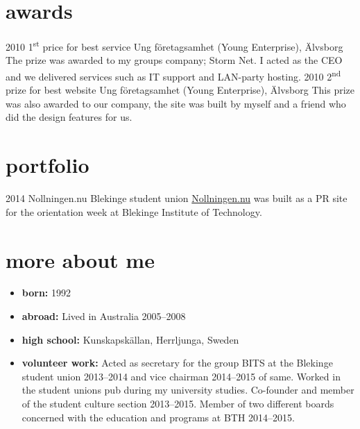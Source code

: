 \documentclass[]{friggeri-cv} %
\begin{document}

\section{awards}

\begin{entrylist}
\entry
{2010}
{1\textsuperscript{st} price for best service}
{Ung företagsamhet (Young Enterprise), Älvsborg}
{The prize was awarded to my groups company; Storm Net. I acted as the CEO and we delivered services such as IT support and LAN-party hosting.}
\entry
{2010}
{2\textsuperscript{nd} prize for best website}
{Ung företagsamhet (Young Enterprise), Älvsborg}
{This prize was also awarded to our company, the site was built by myself and a friend who did the design features for us.}
\end{entrylist}

\newpage
\section{portfolio}

\begin{entrylist}
\entry
{2014}
{Nollningen.nu}
{Blekinge student union}
{\href{http://www.nollningen.nu}{Nollningen.nu} was built as a PR site for the orientation week at Blekinge Institute of Technology.}
\end{entrylist}


\section{more about me}
\begin{itemize}
	\item \textbf{born:} 1992
	\item \textbf{abroad:} Lived in Australia 2005--2008
	\item \textbf{high school:} Kunskapskällan, Herrljunga, Sweden
	\item \textbf{volunteer work:} Acted as secretary for the group BITS at the Blekinge student union 2013--2014 and vice chairman 2014--2015 of same. Worked in the student unions pub during my university studies. Co-founder and member of the student culture section 2013--2015. Member of two different boards concerned with the education and programs at BTH 2014--2015.
\end{itemize}
\end{document}
